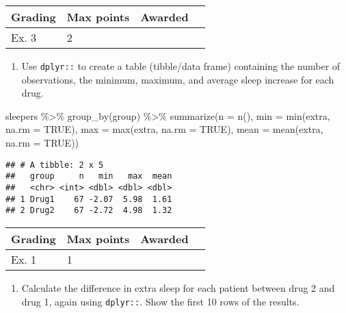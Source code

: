 \documentclass[
]{article}
\newenvironment{Shaded}{\begin{snugshade}}{\end{snugshade}}
\newcommand{\AttributeTok}[1]{\textcolor[rgb]{0.77,0.63,0.00}{#1}}
\newcommand{\ConstantTok}[1]{\textcolor[rgb]{0.00,0.00,0.00}{#1}}
\newcommand{\FunctionTok}[1]{\textcolor[rgb]{0.00,0.00,0.00}{#1}}
\newcommand{\NormalTok}[1]{#1}
\newcommand{\SpecialCharTok}[1]{\textcolor[rgb]{0.00,0.00,0.00}{#1}}
\providecommand{\tightlist}{%
  \setlength{\itemsep}{0pt}\setlength{\parskip}{0pt}}
\begin{document}
\begin{longtable}[]{@{}llll@{}}
\toprule()
Grading & Max points & Awarded & \\
\midrule()
\endhead
Ex. 3 & 2 & & \\
\bottomrule()
\end{longtable}

\begin{enumerate}
\def\labelenumi{\arabic{enumi}.}
\setcounter{enumi}{3}
\tightlist
\item
  Use \texttt{dplyr::} to create a table (tibble/data frame) containing
  the number of observations, the minimum, maximum, and average sleep
  increase for each drug.
\end{enumerate}

\begin{Shaded}
\begin{Highlighting}[]
\NormalTok{sleepers }\SpecialCharTok{\%\textgreater{}\%}
  \FunctionTok{group\_by}\NormalTok{(group) }\SpecialCharTok{\%\textgreater{}\%}
  \FunctionTok{summarize}\NormalTok{(}\AttributeTok{n =} \FunctionTok{n}\NormalTok{(),}
            \AttributeTok{min =} \FunctionTok{min}\NormalTok{(extra, }\AttributeTok{na.rm =} \ConstantTok{TRUE}\NormalTok{),}
            \AttributeTok{max =} \FunctionTok{max}\NormalTok{(extra, }\AttributeTok{na.rm =} \ConstantTok{TRUE}\NormalTok{),}
            \AttributeTok{mean =} \FunctionTok{mean}\NormalTok{(extra, }\AttributeTok{na.rm =} \ConstantTok{TRUE}\NormalTok{))}
\end{Highlighting}
\end{Shaded}

\begin{verbatim}
## # A tibble: 2 x 5
##   group     n   min   max  mean
##   <chr> <int> <dbl> <dbl> <dbl>
## 1 Drug1    67 -2.07  5.98  1.61
## 2 Drug2    67 -2.72  4.98  1.32
\end{verbatim}

\begin{longtable}[]{@{}llll@{}}
\toprule()
Grading & Max points & Awarded & \\
\midrule()
\endhead
Ex. 1 & 1 & & \\
\bottomrule()
\end{longtable}

\begin{enumerate}
\def\labelenumi{\arabic{enumi}.}
\setcounter{enumi}{4}
\tightlist
\item
  Calculate the difference in extra sleep for each patient between drug
  2 and drug 1, again using \texttt{dplyr::}. Show the first 10 rows of
  the results.
\end{enumerate}
\end{document}

